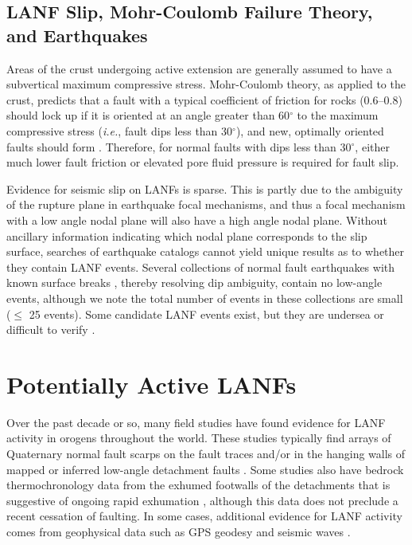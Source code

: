 \documentclass[twocolumn,grl]{AGUTeX}
\begin{document}
\begin{article}
\subsection{LANF Slip, Mohr-Coulomb Failure Theory, and Earthquakes}

Areas of the crust undergoing active extension are generally assumed
to have a subvertical maximum compressive stress.  Mohr-Coulomb
theory, as applied to the crust, predicts that a fault with a typical
coefficient of friction for rocks (0.6--0.8) should lock up if it is
oriented at an angle greater than 60$^\circ$ to the maximum compressive stress  ({\it i.e.}, fault dips less than 30$^\circ$),
and new, optimally oriented faults should form \citep{sibson1985}.  Therefore,
for normal faults with dips less than 30$^\circ$, either much lower
fault friction or elevated pore fluid pressure is required for fault slip.

Evidence for seismic slip on LANFs is sparse.  This is partly due to the
ambiguity of the rupture plane in earthquake focal mechanisms, and thus a focal mechanism with a low angle nodal plane will also have a high angle nodal plane. Without
ancillary information indicating which nodal plane corresponds to the slip surface, searches of earthquake
catalogs cannot yield unique results as to whether they contain LANF events.
Several collections of normal fault earthquakes
with known surface breaks \citep{jackson1987, collettinisibson2001}, thereby
resolving dip ambiguity, contain no low-angle events, although we note the total number of events in these collections
are small ($\le$ 25 events).  Some candidate LANF events exist, but they are
undersea \citep[e.g.,][]{abers2001} or difficult to verify \citep[e.g.,]
[]{doser1987ancash}.


\section{Potentially Active LANFs}

Over the past decade or so, many field studies have found evidence for LANF 
activity in orogens throughout the world. These studies typically find arrays of 
Quaternary normal fault scarps on the fault traces and/or in the hanging walls 
of mapped or inferred low-angle detachment faults \citep [e.g.,]
[]{axen1999baja}. Some studies also have bedrock thermochronology data from the 
exhumed footwalls of the detachments that is suggestive of ongoing rapid 
exhumation \citep [e.g.,][]{sundell2013lunggar}, although this data does not 
preclude a recent cessation of faulting. In some cases, additional evidence for 
LANF activity comes from geophysical data such as GPS geodesy \citep [e.g.,]
[]{hreinsdottir2009altotib} and seismic waves \citep [e.g.,][]{doser1987ancash}.


\end{article}
\end{document}
